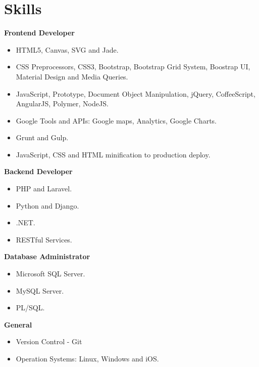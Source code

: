\documentclass[]{friggeri-cv} %
\begin{document}
\section{Skills}

\textbf{Frontend Developer}

\begin{itemize}
	\item HTML5, Canvas, SVG and Jade.
	\item CSS Preprocessors, CSS3, Bootstrap, Bootstrap Grid System, Boostrap UI, Material Design and Media Queries.
	\item JavaScript, Prototype, Document Object Manipulation, jQuery, CoffeeScript, AngularJS, Polymer, NodeJS.
	\item Google Tools and APIs: Google maps, Analytics, Google Charts.
	\item Grunt and Gulp.
	\item JavaScript, CSS and HTML minification to production deploy.
\end{itemize}

\textbf{Backend Developer}
\begin{itemize}
	\item PHP and Laravel.
	\item Python and Django. 
	\item .NET.
	\item RESTful Services.
\end{itemize}

\textbf{Database Administrator}
\begin{itemize}
	\item Microsoft SQL Server.
	\item MySQL Server.
	\item PL/SQL.
\end{itemize}

\textbf{General}
\begin{itemize}
	\item Version Control - Git
	\item Operation Systems: Linux, Windows and iOS.
\end{itemize}

\end{document}
